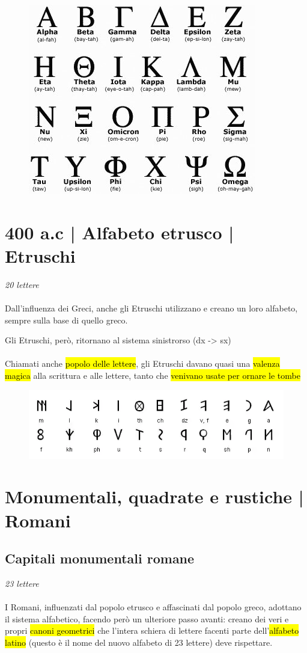 \begin{figure}[H]
    \centering
    \includegraphics[width=0.3\linewidth]{blocco_3 - storia della scrittura/imgs/6006_Una-passeggiata-nel-greco-antico.jpg}
\end{figure}

\section{400 a.c | Alfabeto etrusco | Etruschi}
{\huge \textit{20 lettere}}\\\\
Dall'influenza dei Greci, anche gli Etruschi utilizzano e creano un loro alfabeto, sempre sulla base di quello greco.

Gli Etruschi, però, ritornano al sistema sinistrorso (dx -> sx)
\\\\
Chiamati anche \hl{popolo delle lettere}, gli Etruschi davano quasi una \hl{valenza magica} alla scrittura e alle lettere, tanto che \hl{venivano usate per ornare le tombe}
\begin{figure}[H]
    \centering
    \includegraphics[width=0.5\linewidth]{blocco_3 - storia della scrittura/imgs/alfabeto-etrusco1.png}
\end{figure}
\section{Monumentali, quadrate e rustiche | Romani}
\subsection{Capitali monumentali romane}
{\huge \textit{23 lettere}}\\\\

I Romani, influenzati dal popolo etrusco e affascinati dal popolo greco, adottano il sistema alfabetico, facendo però un ulteriore passo avanti: creano dei veri e propri \hl{canoni geometrici} che l'intera schiera di lettere facenti parte dell'\hl{alfabeto latino} (questo è il nome del nuovo alfabeto di 23 lettere) deve rispettare.

